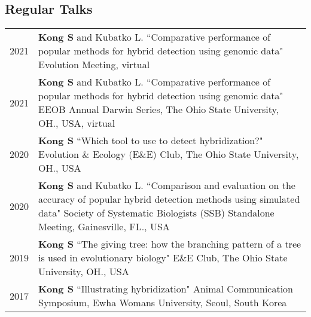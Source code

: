 \documentclass[11pt]{article}
\begin{document}
\subsection*{Regular Talks}
\begin{longtable}{p{}  p{}}
2021 & \textbf{Kong S} and Kubatko L.  ``Comparative performance of popular methods for hybrid detection using genomic data" Evolution Meeting, virtual \textit{} \vspace{5pt} \\ 
2021 & \textbf{Kong S} and Kubatko L.  ``Comparative performance of popular methods for hybrid detection using genomic data" EEOB Annual Darwin Series, The Ohio State University, OH., USA, virtual \vspace{5pt} \\ 
2020 & \textbf{Kong S} ``Which tool to use to detect hybridization?" Evolution \& Ecology (E\&E) Club, The Ohio State University, OH., USA \vspace{5pt} \\
2020 & \textbf{Kong S} and Kubatko L.  ``Comparison and evaluation on the accuracy of popular hybrid detection methods using simulated data" Society of Systematic Biologists (SSB) Standalone Meeting, Gainesville, FL., USA \vspace{5pt} \\ 
2019 &  \textbf{Kong S} ``The giving tree: how the branching pattern of a tree is used in evolutionary biology" E\&E Club, The Ohio State University, OH., USA \vspace{5pt} \\  

2017 & \textbf{Kong S} ``Illustrating hybridization" Animal Communication Symposium, Ewha Womans University, Seoul, South Korea \vspace{5pt} \\  

\end{longtable}
\end{document}

